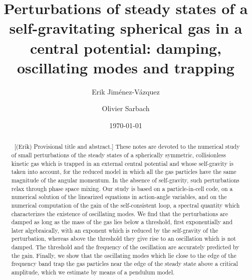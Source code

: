 \documentclass[prd,aps,showpacs,nofootinbib,superscriptaddress,amsmath,amssymb]{revtex4}
\newcommand{\EJ}[1]{{\color{red}~\textsf{[(Erik) #1]}}}
\begin{document}


\title{Perturbations of steady states of a self-gravitating spherical gas in a central potential: damping, oscillating modes and trapping}

\author{Erik Jim\'enez-V\'azquez}
\affiliation{\EJ{Affiliation to be completed.}}

\author{Olivier Sarbach}


\begin{abstract}
\EJ{Provisional title and abstract.}
These notes are devoted to the numerical study of small perturbations of the steady states of a spherically symmetric, collisionless kinetic gas which is trapped in an external central potential and whose self-gravity is taken into account, for the reduced model in which all the gas particles have the same magnitude of the angular momentum. In the absence of self-gravity, such perturbations relax through phase space mixing. Our study is based on a particle-in-cell code, on a numerical solution of the linearized equations in action-angle variables, and on the numerical computation of the gain of the self-consistent loop, a spectral quantity which characterizes the existence of oscillating modes. We find that the perturbations are damped as long as the mass of the gas lies below a threshold, first exponentially and later algebraically, with an exponent which is reduced by the self-gravity of the perturbation, whereas above the threshold they give rise to an oscillation which is not damped. The threshold and the frequency of the oscillation are accurately predicted by the gain. Finally, we show that the oscillating modes which lie close to the edge of the frequency band trap the gas particles near the edge of the steady state above a critical amplitude, which we estimate by means of a pendulum model.
\end{abstract}

\date{\today}


\maketitle
\end{document}
